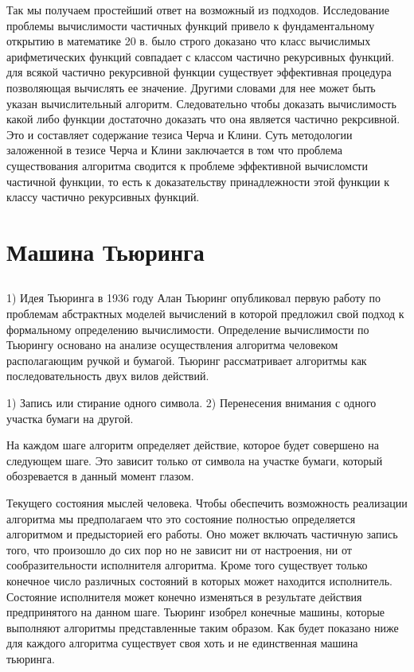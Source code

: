 Так мы получаем простейший ответ на возможный из подходов. Исследование проблемы вычислимости частичных функций привело к фундаментальному открытию в математике 20 в. было строго доказано что класс вычислимых арифметических функций совпадает с классом частично рекурсивных функций. для всякой частично рекурсивной функции существует эффективная процедура позволяющая вычислять ее значение. Другими словами для нее может быть указан вычислительный алгоритм. Следовательно чтобы доказать вычислимость какой либо функции достаточно доказать что она является частично рекрсивной. Это и составляет содержание тезиса Черча и Клини. Суть методологии заложенной в тезисе Черча и Клини заключается в том что проблема существования алгоритма сводится к проблеме эффективной вычисломсти частичной функции, то есть к доказательству принадлежности этой функции к классу частично рекурсивных функций.


\section{Машина Тьюринга}
\subsection{}
1) Идея Тьюринга в 1936 году Алан Тьюринг опубликовал первую работу по проблемам абстрактных моделей вычислений в которой предложил свой подход к формальному определению вычислимости. Определение вычислимости по Тьюрингу основано на анализе осуществления алгоритма человеком располагающим ручкой и бумагой. Тьюринг рассматривает алгоритмы как последовательность двух вилов действий.

1) Запись или стирание одного символа.
2) Перенесения внимания с одного участка бумаги на другой.

На каждом шаге алгоритм определяет действие, которое будет совершено на следующем шаге. Это зависит только от символа на участке бумаги, который обозревается в данный момент глазом.

Текущего состояния мыслей человека. Чтобы обеспечить возможность реализации алгоритма мы предполагаем что это состояние полностью определяется алгоритмом и предысторией его работы. Оно может включать частичную запись того, что произошло до сих пор но не зависит ни от настроения, ни от сообразительности исполнителя алгоритма. Кроме того существует только конечное число различных состояний в которых может находится исполнитель. Состояние исполнителя может конечно изменяться в результате действия предпринятого на данном шаге. Тьюринг изобрел конечные машины, которые выполняют алгоритмы представленные таким образом. Как будет показано ниже для каждого алгоритма существует своя хоть и не единственная машина тьюринга.

